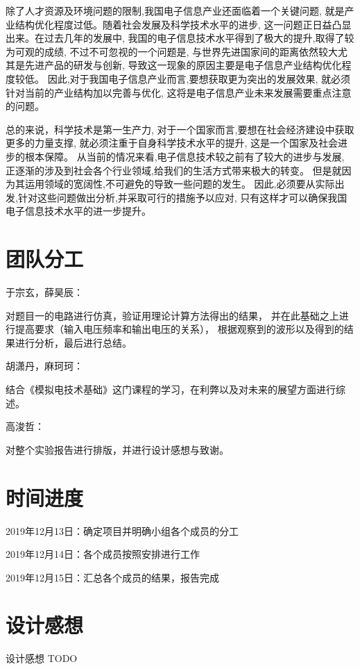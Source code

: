 \documentclass[10pt, conference, compsocconf, a4paper]{IEEEtran}
\begin{document}
除了人才资源及环境问题的限制,我国电子信息产业还面临着一个关键问题,
就是产业结构优化程度过低。随着社会发展及科学技术水平的进步,
这一问题正日益凸显出来。在过去几年的发展中,
我国的电子信息技术水平得到了极大的提升,取得了较为可观的成绩,
不过不可忽视的一个问题是,
与世界先进国家间的距离依然较大尤其是先进产品的研发与创新,
导致这一现象的原因主要是电子信息产业结构优化程度较低。
因此,对于我国电子信息产业而言,要想获取更为突出的发展效果,
就必须针对当前的产业结构加以完善与优化,
这将是电子信息产业未来发展需要重点注意的问题。\cite{chen2014}
\par

总的来说，科学技术是第一生产力,
对于一个国家而言,要想在社会经济建设中获取更多的力量支撑,
就必须注重于自身科学技术水平的提升,
这是一个国家及社会进步的根本保障。
从当前的情况来看,电子信息技术较之前有了较大的进步与发展,
正逐渐的涉及到社会各个行业领域,给我们的生活方式带来极大的转变。
但是就因为其运用领域的宽阔性,不可避免的导致一些问题的发生。
因此,必须要从实际出发,针对这些问题做出分析,并采取可行的措施予以应对,
只有这样才可以确保我国电子信息技术水平的进一步提升。\par


\section{团队分工}

于宗玄，薛昊辰：\par
对题目一的电路进行仿真，验证用理论计算方法得出的结果，
并在此基础之上进行提高要求（输入电压频率和输出电压的关系）， 
根据观察到的波形以及得到的结果进行分析，最后进行总结。

胡潇丹，麻珂珂：\par
结合《模拟电技术基础》这门课程的学习，在利弊以及对未来的展望方面进行综述。

高浚哲：\par
对整个实验报告进行排版，并进行设计感想与致谢。


\section{时间进度}

2019年12月13日：确定项目并明确小组各个成员的分工\par
2019年12月14日：各个成员按照安排进行工作\par
2019年12月15日：汇总各个成员的结果，报告完成\par

\section{设计感想}
设计感想 TODO
\end{document}
